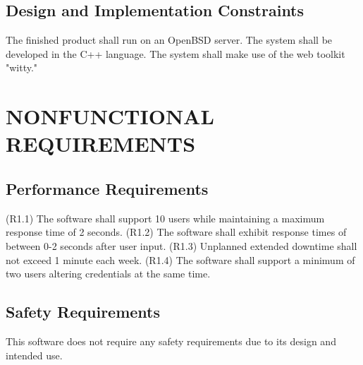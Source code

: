 \documentclass[letterpaper,12pt,oneside,listof=totoc]{scrreprt}
\begin{document}
\section{Design and Implementation Constraints}
The finished product shall run on an OpenBSD server. The system shall be developed in the C++ language. The system shall make use of the web toolkit "witty."

\chapter{NONFUNCTIONAL REQUIREMENTS}

\section{Performance Requirements}

(R1.1) The software shall support 10 users while maintaining a maximum response time of 2 seconds.\newline
(R1.2) The software shall exhibit response times of between 0-2 seconds after user input.\newline
(R1.3) Unplanned extended downtime shall not exceed 1 minute each week.\newline
(R1.4) The software shall support a minimum of two users altering credentials at the same time.\newline


\section{Safety Requirements}
This software does not require any safety requirements due to its design and intended use.
\end{document}
